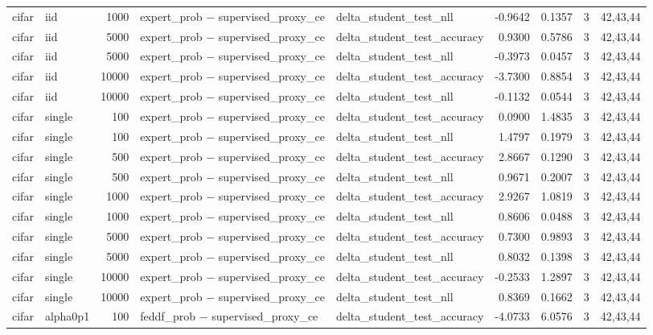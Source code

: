 \begin{tabular}{llrllrrrl}
cifar & iid & 1000 & expert\_prob − supervised\_proxy\_ce & delta\_student\_test\_nll & -0.9642 & 0.1357 & 3 & 42,43,44 \\
cifar & iid & 5000 & expert\_prob − supervised\_proxy\_ce & delta\_student\_test\_accuracy & 0.9300 & 0.5786 & 3 & 42,43,44 \\
cifar & iid & 5000 & expert\_prob − supervised\_proxy\_ce & delta\_student\_test\_nll & -0.3973 & 0.0457 & 3 & 42,43,44 \\
cifar & iid & 10000 & expert\_prob − supervised\_proxy\_ce & delta\_student\_test\_accuracy & -3.7300 & 0.8854 & 3 & 42,43,44 \\
cifar & iid & 10000 & expert\_prob − supervised\_proxy\_ce & delta\_student\_test\_nll & -0.1132 & 0.0544 & 3 & 42,43,44 \\
cifar & single & 100 & expert\_prob − supervised\_proxy\_ce & delta\_student\_test\_accuracy & 0.0900 & 1.4835 & 3 & 42,43,44 \\
cifar & single & 100 & expert\_prob − supervised\_proxy\_ce & delta\_student\_test\_nll & 1.4797 & 0.1979 & 3 & 42,43,44 \\
cifar & single & 500 & expert\_prob − supervised\_proxy\_ce & delta\_student\_test\_accuracy & 2.8667 & 0.1290 & 3 & 42,43,44 \\
cifar & single & 500 & expert\_prob − supervised\_proxy\_ce & delta\_student\_test\_nll & 0.9671 & 0.2007 & 3 & 42,43,44 \\
cifar & single & 1000 & expert\_prob − supervised\_proxy\_ce & delta\_student\_test\_accuracy & 2.9267 & 1.0819 & 3 & 42,43,44 \\
cifar & single & 1000 & expert\_prob − supervised\_proxy\_ce & delta\_student\_test\_nll & 0.8606 & 0.0488 & 3 & 42,43,44 \\
cifar & single & 5000 & expert\_prob − supervised\_proxy\_ce & delta\_student\_test\_accuracy & 0.7300 & 0.9893 & 3 & 42,43,44 \\
cifar & single & 5000 & expert\_prob − supervised\_proxy\_ce & delta\_student\_test\_nll & 0.8032 & 0.1398 & 3 & 42,43,44 \\
cifar & single & 10000 & expert\_prob − supervised\_proxy\_ce & delta\_student\_test\_accuracy & -0.2533 & 1.2897 & 3 & 42,43,44 \\
cifar & single & 10000 & expert\_prob − supervised\_proxy\_ce & delta\_student\_test\_nll & 0.8369 & 0.1662 & 3 & 42,43,44 \\
cifar & alpha0p1 & 100 & feddf\_prob − supervised\_proxy\_ce & delta\_student\_test\_accuracy & -4.0733 & 6.0576 & 3 & 42,43,44 \\

\end{tabular}
